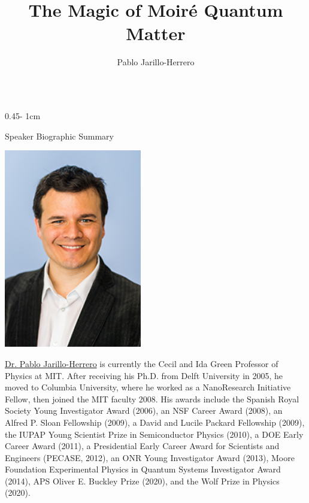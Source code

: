 \documentclass{../psuposter}
\title{The Magic of Moiré Quantum Matter}
\author{Pablo Jarillo-Herrero}
\institute{Massachusetts Institute of Technology}
\begin{document}
\begin{frame}
\begin{columns}[t, totalwidth=\textwidth]
\begin{column}{0.45\textwidth - 1cm}


    \begin{block}{Speaker Biographic Summary}
    	\begin{center}
    		\includegraphics[width=0.45\textwidth]{images/portrait}
    	\end{center}
    	\href{http://jarilloherrero.mit.edu}{Dr. Pablo Jarillo-Herrero} is currently the Cecil and Ida Green Professor of Physics at MIT. 
    	After receiving his Ph.D. from Delft University in 2005, he moved to Columbia University, where he worked as a NanoResearch Initiative Fellow, then joined the MIT faculty 2008.
    	His awards include the Spanish Royal Society Young Investigator Award (2006), an NSF Career Award (2008), an Alfred P. Sloan Fellowship (2009), a David and Lucile Packard Fellowship (2009), the IUPAP Young Scientist Prize in Semiconductor Physics (2010), a DOE Early Career Award (2011), a Presidential Early Career Award for Scientists and Engineers (PECASE, 2012), an ONR Young Investigator Award (2013), Moore Foundation Experimental Physics in Quantum Systems Investigator Award (2014), APS Oliver E. Buckley Prize (2020), and the Wolf Prize in Physics (2020). 
    \end{block}



\end{column}
\end{columns}
\end{frame}
\end{document}
